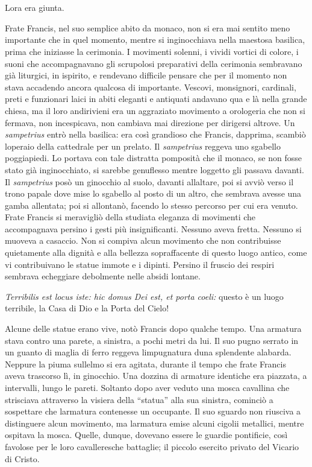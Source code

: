 	\chapter{\phantom{title}}

\lettrine[lhang=0.2]{L}{}\textquotesingle ora era giunta.

Frate Francis, nel suo semplice abito da monaco, non si era mai sentito
meno importante che in quel momento, mentre si inginocchiava nella
maestosa basilica, prima che iniziasse la cerimonia. I movimenti
solenni, i vividi vortici di colore, i suoni che accompagnavano gli
scrupolosi preparativi della cerimonia sembravano già liturgici, in
ispirito, e rendevano difficile pensare che per il momento non stava
accadendo ancora qualcosa di importante. Vescovi, monsignori, cardinali,
preti e funzionari laici in abiti eleganti e antiquati andavano qua e là
nella grande chiesa, ma il loro andirivieni era un aggraziato movimento
a orologeria che non si fermava, non incespicava, non cambiava mai
direzione per dirigersi altrove. Un \emph{sampetrius} entrò nella
basilica: era così grandioso che Francis, dapprima, scambiò
l\textquotesingle operaio della cattedrale per un prelato. Il
\emph{sampetrius} reggeva uno sgabello poggiapiedi. Lo portava con tale
distratta pomposità che il monaco, se non fosse stato già inginocchiato,
si sarebbe genuflesso mentre l\textquotesingle oggetto gli passava
davanti. Il \emph{sampetrius} posò un ginocchio al suolo, davanti
all\textquotesingle altare, poi si avviò verso il trono papale dove mise
lo sgabello al posto di un altro, che sembrava avesse una gamba
allentata; poi si allontanò, facendo lo stesso percorso per cui era
venuto. Frate Francis si meravigliò della studiata eleganza di movimenti
che accompagnava persino i gesti più insignificanti. Nessuno aveva
fretta. Nessuno si muoveva a casaccio. Non si compiva alcun movimento
che non contribuisse quietamente alla dignità e alla bellezza
sopraffacente di questo luogo antico, come vi contribuivano le statue
immote e i dipinti. Persino il fruscio dei respiri sembrava echeggiare
debolmente nelle absidi lontane.

\emph{Terribilis est locus iste: hic domus Dei est, et porta coeli:}
questo è un luogo terribile, la Casa di Dio e la Porta del Cielo!

Alcune delle statue erano vive, notò Francis dopo qualche tempo. Una
armatura stava contro una parete, a sinistra, a pochi metri da lui. Il
suo pugno serrato in un guanto di maglia di ferro reggeva
l\textquotesingle impugnatura d\textquotesingle una splendente alabarda.
Neppure la piuma sull\textquotesingle elmo si era agitata, durante il
tempo che frate Francis aveva trascorso lì, in ginocchio. Una dozzina di
armature identiche era piazzata, a intervalli, lungo le pareti. Soltanto
dopo aver veduto una mosca cavallina che strisciava attraverso la
visiera della ``statua'' alla sua sinistra, cominciò a sospettare che
l\textquotesingle armatura contenesse un occupante. Il suo sguardo non
riusciva a distinguere alcun movimento, ma l\textquotesingle armatura
emise alcuni cigolii metallici, mentre ospitava la mosca. Quelle,
dunque, dovevano essere le guardie pontificie, così favolose per le loro
cavalleresche battaglie; il piccolo esercito privato del Vicario di
Cristo.


